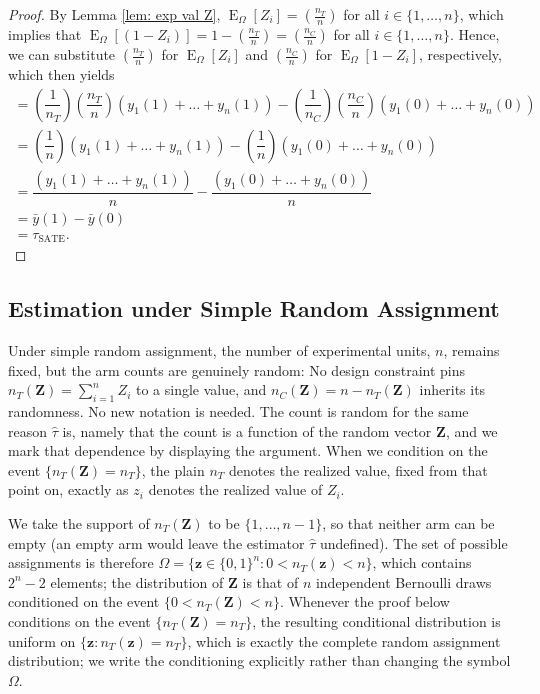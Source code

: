 \documentclass[12pt,leqno]{article}
\theoremstyle{newstyle}
\DeclareMathOperator{\E}{\mathrm{E}}
\DeclareMathOperator{\Var}{\mathrm{Var}}
\newcommand{\bZ}{\bm{Z}}   \newcommand{\bz}{\bm{z}}   %
\newcommand{\EZ}{\E_{\Omega}}    \newcommand{\VarZ}{\Var_{\Omega}}  %
\newcommand{\po}[2]{y_{#1}(#2)}     %
\newcommand{\ybar}[1]{\bar{y}(#1)}  %
\newcommand{\tauS}{\tau_{\text{SATE}}}
\newcommand{\tauhat}{\hat{\tau}}
\begin{document}
\begin{proof}
By Lemma \ref{lem: exp val Z}, $\EZ[Z_i ] = (\frac{n_T}{n})$ for all $i \in \{1, \ldots  , n\}$, which implies that $\EZ[(1 - Z_i) ] = 1 - (\frac{n_T}{n}) = (\frac{n_C}{n})$ for all $i \in \{1, \ldots  , n\}$. Hence, we can substitute $(\frac{n_T}{n})$ for $\EZ[Z_i ]$ and $(\frac{n_C}{n})$ for $\EZ[1 - Z_i ]$, respectively, which then yields
\begin{align*}
= \left(\dfrac{1}{n_T} \right) \left(\dfrac{n_T}{n}\right) \left(\po{1}{1} + \dots + \po{n}{1} \right) - \left(\dfrac{1}{n_C}\right) \left(\dfrac{n_C}{n}\right) \left(\po{1}{0} + \dots + \po{n}{0} \right) \\
= \left(\dfrac{1}{n} \right) \left(\po{1}{1} + \dots + \po{n}{1} \right) - \left(\dfrac{1}{n}\right) \left(\po{1}{0} + \dots + \po{n}{0} \right) \\
= \dfrac{\left(\po{1}{1} + \dots + \po{n}{1} \right)}{n} - \dfrac{\left(\po{1}{0} + \dots + \po{n}{0} \right)}{n} \\
= \ybar{1} - \ybar{0} \\
= \tauS.
\end{align*}
\end{proof}

\subsection{Estimation under Simple Random Assignment} \label{sec: simple assign}

Under simple random assignment, the number of experimental units, $n$, remains fixed, but the arm counts are genuinely random: No design constraint pins $n_T(\bZ) = \sum_{i = 1}^n Z_i$ to a single value, and $n_C(\bZ) = n - n_T(\bZ)$ inherits its randomness. No new notation is needed. The count is random for the same reason $\tauhat$ is, namely that the count is a function of the random vector $\bZ$, and we mark that dependence by displaying the argument. When we condition on the event $\{n_T(\bZ) = n_T\}$, the plain $n_T$ denotes the realized value, fixed from that point on, exactly as $z_i$ denotes the realized value of $Z_i$.

We take the support of $n_T(\bZ)$ to be $\{1, \dots , n - 1\}$, so that neither arm can be empty (an empty arm would leave the estimator $\tauhat$ undefined). The set of possible assignments is therefore $\Omega = \{\bz \in \{0, 1\}^n: 0 < n_T(\bz) < n \}$, which contains $2^n - 2$ elements; the distribution of $\bZ$ is that of $n$ independent Bernoulli draws conditioned on the event $\{0 < n_T(\bZ) < n\}$. Whenever the proof below conditions on the event $\{n_T(\bZ) = n_T\}$, the resulting conditional distribution is uniform on $\{\bz: n_T(\bz) = n_T\}$, which is exactly the complete random assignment distribution; we write the conditioning explicitly rather than changing the symbol $\Omega$.
\end{document}
